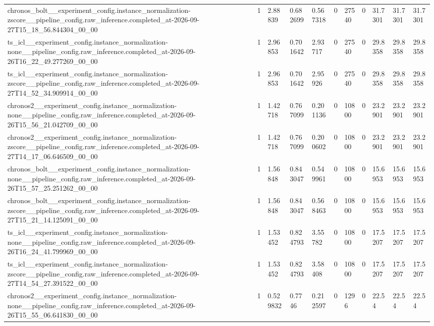 \begin{tabular}{lllllllllll}
chronos\_bolt\_\_experiment\_config.instance\_normalization-zscore\_\_pipeline\_config.raw\_inference.completed\_at-2026-09-27T15\_18\_56.844304\_00\_00 & 1 & 2.88839 & 0.682699 & 0.567318 & 0 & 27540 & 0 & 31.7301 & 31.7301 & 31.7301 \\
ts\_icl\_\_experiment\_config.instance\_normalization-none\_\_pipeline\_config.raw\_inference.completed\_at-2026-09-26T16\_22\_49.277269\_00\_00 & 1 & 2.96853 & 0.701642 & 2.93717 & 0 & 27540 & 0 & 29.8358 & 29.8358 & 29.8358 \\
ts\_icl\_\_experiment\_config.instance\_normalization-zscore\_\_pipeline\_config.raw\_inference.completed\_at-2026-09-27T14\_52\_34.909914\_00\_00 & 1 & 2.96853 & 0.701642 & 2.95926 & 0 & 27540 & 0 & 29.8358 & 29.8358 & 29.8358 \\
chronos2\_\_experiment\_config.instance\_normalization-none\_\_pipeline\_config.raw\_inference.completed\_at-2026-09-26T15\_56\_21.042709\_00\_00 & 1 & 1.42718 & 0.767099 & 0.201136 & 0 & 10800 & 0 & 23.2901 & 23.2901 & 23.2901 \\
chronos2\_\_experiment\_config.instance\_normalization-zscore\_\_pipeline\_config.raw\_inference.completed\_at-2026-09-27T14\_17\_06.646509\_00\_00 & 1 & 1.42718 & 0.767099 & 0.200602 & 0 & 10800 & 0 & 23.2901 & 23.2901 & 23.2901 \\
chronos\_bolt\_\_experiment\_config.instance\_normalization-none\_\_pipeline\_config.raw\_inference.completed\_at-2026-09-26T15\_57\_25.251262\_00\_00 & 1 & 1.56848 & 0.843047 & 0.549961 & 0 & 10800 & 0 & 15.6953 & 15.6953 & 15.6953 \\
chronos\_bolt\_\_experiment\_config.instance\_normalization-zscore\_\_pipeline\_config.raw\_inference.completed\_at-2026-09-27T15\_21\_14.125091\_00\_00 & 1 & 1.56848 & 0.843047 & 0.568463 & 0 & 10800 & 0 & 15.6953 & 15.6953 & 15.6953 \\
ts\_icl\_\_experiment\_config.instance\_normalization-none\_\_pipeline\_config.raw\_inference.completed\_at-2026-09-26T16\_24\_41.799969\_00\_00 & 1 & 1.53452 & 0.824793 & 3.55782 & 0 & 10800 & 0 & 17.5207 & 17.5207 & 17.5207 \\
ts\_icl\_\_experiment\_config.instance\_normalization-zscore\_\_pipeline\_config.raw\_inference.completed\_at-2026-09-27T14\_54\_27.391522\_00\_00 & 1 & 1.53452 & 0.824793 & 3.58408 & 0 & 10800 & 0 & 17.5207 & 17.5207 & 17.5207 \\
chronos2\_\_experiment\_config.instance\_normalization-none\_\_pipeline\_config.raw\_inference.completed\_at-2026-09-26T15\_55\_06.641830\_00\_00 & 1 & 0.529832 & 0.7746 & 0.212597 & 0 & 1296 & 0 & 22.54 & 22.54 & 22.54 \\

\end{tabular}
